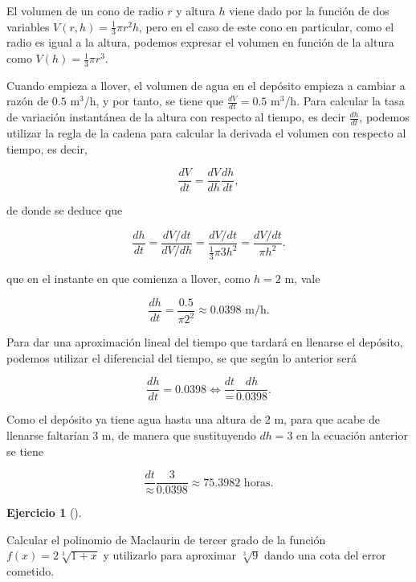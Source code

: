 \documentclass[
  spanish,
  a4paper,
]{scrreport}
\theoremstyle{definition}
\newtheorem{exercise}{Ejercicio}[chapter]
\theoremstyle{remark}
\begin{document}
\begin{tcolorbox}[enhanced jigsaw, arc=.35mm, bottomrule=.15mm, bottomtitle=1mm, breakable, colback=white, colbacktitle=quarto-callout-tip-color!10!white, colframe=quarto-callout-tip-color-frame, coltitle=black, left=2mm, leftrule=.75mm, opacityback=0, opacitybacktitle=0.6, rightrule=.15mm, title=\textcolor{quarto-callout-tip-color}{\faLightbulb}\hspace{0.5em}{Solución}, titlerule=0mm, toprule=.15mm, toptitle=1mm]

El volumen de un cono de radio \(r\) y altura \(h\) viene dado por la
función de dos variables \(V(r,h)=\frac{1}{3}\pi r^2h\), pero en el caso
de este cono en particular, como el radio es igual a la altura, podemos
expresar el volumen en función de la altura como
\(V(h) = \frac{1}{3}\pi r^3\).

Cuando empieza a llover, el volumen de agua en el depósito empieza a
cambiar a razón de \(0.5\) m\(^3\)/h, y por tanto, se tiene que
\(\frac{dV}{dt} = 0.5\) m\(^3\)/h. Para calcular la tasa de variación
instantánea de la altura con respecto al tiempo, es decir
\(\frac{dh}{dt}\), podemos utilizar la regla de la cadena para calcular
la derivada el volumen con respecto al tiempo, es decir,

\[
\frac{dV}{dt} = \frac{dV}{dh}\frac{dh}{dt},
\]

de donde se deduce que

\[
\frac{dh}{dt} 
= \frac{dV/dt}{dV/dh} 
= \frac{dV/dt}{\frac{1}{3}\pi 3h^2} 
= \frac{dV/dt}{\pi h^2}.
\]

que en el instante en que comienza a llover, como \(h=2\) m, vale

\[
\frac{dh}{dt} = \frac{0.5}{\pi 2^2} \approx 0.0398 \mbox{ m/h}.
\]

Para dar una aproximación lineal del tiempo que tardará en llenarse el
depósito, podemos utilizar el diferencial del tiempo, se que según lo
anterior será

\[
\frac{dh}{dt} = 0.0398 \Leftrightarrow \frac{dt} = \frac{dh}{0.0398}.
\]

Como el depósito ya tiene agua hasta una altura de \(2\) m, para que
acabe de llenarse faltarían \(3\) m, de manera que sustituyendo \(dh=3\)
en la ecuación anterior se tiene

\[
\frac{dt} \approx \frac{3}{0.0398} \approx 75.3982 \mbox{ horas}.
\]

\end{tcolorbox}

\begin{exercise}[]\protect\hypertarget{exr-6}{}\label{exr-6}

Calcular el polinomio de Maclaurin de tercer grado de la función
\(f(x) = 2\sqrt[3]{{1 + x}}\) y utilizarlo para aproximar
\(\sqrt[3]{9}\) dando una cota del error cometido.

\end{exercise}
\end{document}
